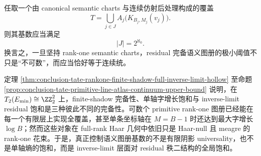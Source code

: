 \begin{conjecture}\label{conj:conclusion-tate-rankone-semantic-atlas-minimal-continuum}
任取一个由 canonical semantic charts 与连续仿射后处理构成的覆盖
\[
T=\bigcup_{j\in J}A_j\bigl(K_{B_j,M_j}(v_j)\bigr).
\]
则其基数应当满足
\[
|J|=2^{\aleph_0}.
\]
换言之，一旦坚持 rank-one semantic charts，residual 完备语义图册的极小阈值不只是“不可数”，而应当恰好等于连续统。
\end{conjecture}

\noindent
定理 \ref{thm:conclusion-tate-rankone-finite-shadow-full-inverse-limit-hollow} 至命题 \ref{prop:conclusion-tate-primitive-line-atlas-continuum-upper-bound} 说明，在 \(T_2(E_{\min})\cong \ZZ_2^2\) 上，finite-shadow 完备性、单轴字增长饱和与 inverse-limit residual 饱和是三种彼此不同的完备性。可数个 primitive rank-one 图册已经能在每一个有限层上实现全覆盖，甚至单条坐标轴在 \(M=B-1\) 时还达到最大字增长 \(\log B\)；然而这些对象在 full-rank Haar 几何中依旧只是 Haar-null 且 meagre 的 rank-one 花束。于是，真正控制语义图册基数的不是有限阴影 universality，也不是单轴熵的饱和，而是 inverse-limit 层面对 residual 秩二结构的全局饱和。
